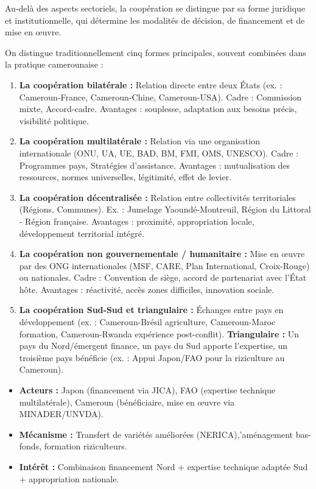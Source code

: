 \documentclass[11pt]{article}
\newcommand{\cle}[1]{{\popxbold\color{popdark}#1}}
\begin{document}
Au-delà des aspects sectoriels, la coopération se distingue par sa \cle{forme juridique et institutionnelle}, qui détermine les modalités de décision, de financement et de mise en œuvre.

\begin{definition}
On distingue traditionnellement cinq formes principales, souvent combinées dans la pratique camerounaise :
\begin{enumerate}
    \item \textbf{La coopération bilatérale :} Relation directe entre deux États (ex. : Cameroun-France, Cameroun-Chine, Cameroun-USA). Cadre : Commission mixte, Accord-cadre. Avantages : souplesse, adaptation aux besoins précis, visibilité politique.
    \item \textbf{La coopération multilatérale :} Relation via une organisation internationale (ONU, UA, UE, BAD, BM, FMI, OMS, UNESCO). Cadre : Programmes pays, Stratégies d'assistance. Avantages : mutualisation des ressources, normes universelles, légitimité, effet de levier.
    \item \textbf{La coopération décentralisée :} Relation entre collectivités territoriales (Régions, Communes). Ex. : Jumelage Yaoundé-Montreuil, Région du Littoral - Région française. Avantages : proximité, appropriation locale, développement territorial intégré.
    \item \textbf{La coopération non gouvernementale / humanitaire :} Mise en œuvre par des ONG internationales (MSF, CARE, Plan International, Croix-Rouge) ou nationales. Cadre : Convention de siège, accord de partenariat avec l'État hôte. Avantages : réactivité, accès zones difficiles, innovation sociale.
    \item \textbf{La coopération Sud-Sud et triangulaire :} Échanges entre pays en développement (ex. : Cameroun-Brésil agriculture, Cameroun-Maroc formation, Cameroun-Rwanda expérience post-conflit). \textbf{Triangulaire :} Un pays du Nord/émergent finance, un pays du Sud apporte l'expertise, un troisième pays bénéficie (ex. : Appui Japon/FAO pour la riziculture au Cameroun).
\end{enumerate}
\end{definition}

\begin{exemplebox}
\begin{itemize}
    \item \textbf{Acteurs :} Japon (financement via JICA), FAO (expertise technique multilatérale), Cameroun (bénéficiaire, mise en œuvre via MINADER/UNVDA).
    \item \textbf{Mécanisme :} Transfert de variétés améliorées (NERICA),'aménagement bas-fonds, formation riziculteurs.
    \item \textbf{Intérêt :} Combinaison financement Nord + expertise technique adaptée Sud + appropriation nationale.
\end{itemize}
\end{exemplebox}
\end{document}

